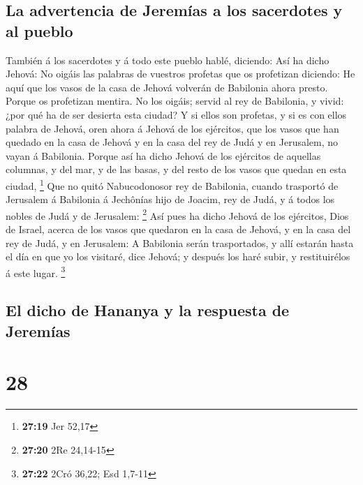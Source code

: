\hypertarget{la-advertencia-de-jeremuxedas-a-los-sacerdotes-y-al-pueblo}{%
\subsection{La advertencia de Jeremías a los sacerdotes y al
pueblo}\label{la-advertencia-de-jeremuxedas-a-los-sacerdotes-y-al-pueblo}}

 También á los sacerdotes y á todo este pueblo hablé,
diciendo: Así ha dicho Jehová: No oigáis las palabras de vuestros
profetas que os profetizan diciendo: He aquí que los vasos de la casa de
Jehová volverán de Babilonia ahora presto. Porque os profetizan mentira.
 No los oigáis; servid al rey de Babilonia, y vivid: ¿por
qué ha de ser desierta esta ciudad?  Y si ellos son
profetas, y si es con ellos palabra de Jehová, oren ahora á Jehová de
los ejércitos, que los vasos que han quedado en la casa de Jehová y en
la casa del rey de Judá y en Jerusalem, no vayan á Babilonia.
 Porque así ha dicho Jehová de los ejércitos de aquellas
columnas, y del mar, y de las basas, y del resto de los vasos que quedan
en esta ciudad, \footnote{\textbf{27:19} Jer 52,17}  Que
no quitó Nabucodonosor rey de Babilonia, cuando trasportó de Jerusalem á
Babilonia á Jechônías hijo de Joacim, rey de Judá, y á todos los nobles
de Judá y de Jerusalem: \footnote{\textbf{27:20} 2Re 24,14-15}
 Así pues ha dicho Jehová de los ejércitos, Dios de
Israel, acerca de los vasos que quedaron en la casa de Jehová, y en la
casa del rey de Judá, y en Jerusalem:  A Babilonia serán
trasportados, y allí estarán hasta el día en que yo los visitaré, dice
Jehová; y después los haré subir, y restituirélos á este lugar.
\footnote{\textbf{27:22} 2Cró 36,22; Esd 1,7-11}

\hypertarget{el-dicho-de-hananya-y-la-respuesta-de-jeremuxedas}{%
\subsection{El dicho de Hananya y la respuesta de
Jeremías}\label{el-dicho-de-hananya-y-la-respuesta-de-jeremuxedas}}

\hypertarget{section-27}{%
\section{28}\label{section-27}}

